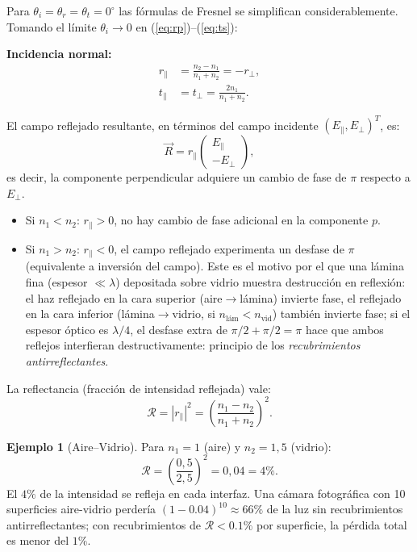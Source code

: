 \documentclass[12pt, a4paper]{article}
\theoremstyle{plain}
\theoremstyle{definition}
\newtheorem{ejemplo}{Ejemplo}[section]
\theoremstyle{remark}
\newcommand{\ve}[1]{\vec{#1}}
\begin{document}
Para $\theta_i = \theta_r = \theta_t = 0^{\circ}$ las fórmulas de Fresnel se
simplifican considerablemente. Tomando el límite $\theta_i \to 0$ en
(\ref{eq:rp})--(\ref{eq:ts}):

\begin{mdframed}[style=resultado,nobreak=true]
\textbf{Incidencia normal:}
\begin{align}
  r_\parallel &= \frac{n_2 - n_1}{n_1 + n_2} = -r_\perp,
  \label{eq:r_normal} \\
  t_\parallel &= t_\perp = \frac{2n_1}{n_1 + n_2}.
  \label{eq:t_normal}
\end{align}
\end{mdframed}

El campo reflejado resultante, en términos del campo incidente
$(E_\parallel, E_\perp)^T$, es:
\[
  \ve{R} = r_\parallel \begin{pmatrix} E_\parallel \\ -E_\perp \end{pmatrix},
\]
es decir, la componente perpendicular adquiere un cambio de fase de
$\pi$ respecto a $E_\perp$.

\begin{itemize}
  \item Si $n_1 < n_2$: $r_\parallel > 0$, no hay cambio de fase adicional
        en la componente $p$.
  \item Si $n_1 > n_2$: $r_\parallel < 0$, el campo reflejado experimenta
        un desfase de $\pi$ (equivalente a inversión del campo). Este es el
        motivo por el que una lámina fina (espesor $\ll \lambda$) depositada
        sobre vidrio muestra destrucción en reflexión: el haz reflejado en la
        cara superior (aire$\to$lámina) invierte fase, el reflejado en la cara
        inferior (lámina$\to$vidrio, si $n_{\text{lám}} < n_{\text{vid}}$)
        también invierte fase; si el espesor óptico es $\lambda/4$, el desfase
        extra de $\pi/2 + \pi/2 = \pi$ hace que ambos reflejos interfieran
        destructivamente: principio de los \emph{recubrimientos antirreflectantes}.
\end{itemize}

La reflectancia (fracción de intensidad reflejada) vale:
\[
  \mathcal{R} = |r_\parallel|^2 = \left(\frac{n_1 - n_2}{n_1 + n_2}\right)^2.
\]

\begin{ejemplo}[Aire--Vidrio]
Para $n_1 = 1$ (aire) y $n_2 = 1{,}5$ (vidrio):
\[
  \mathcal{R} = \left(\frac{0{,}5}{2{,}5}\right)^2 = 0{,}04 = 4\%.
\]
El $4\%$ de la intensidad se refleja en cada interfaz. Una cámara fotográfica
con 10 superficies aire-vidrio perdería $(1-0.04)^{10} \approx 66\%$ de la
luz sin recubrimientos antirreflectantes; con recubrimientos de $\mathcal{R}
< 0.1\%$ por superficie, la pérdida total es menor del $1\%$.
\end{ejemplo}
\end{document}
